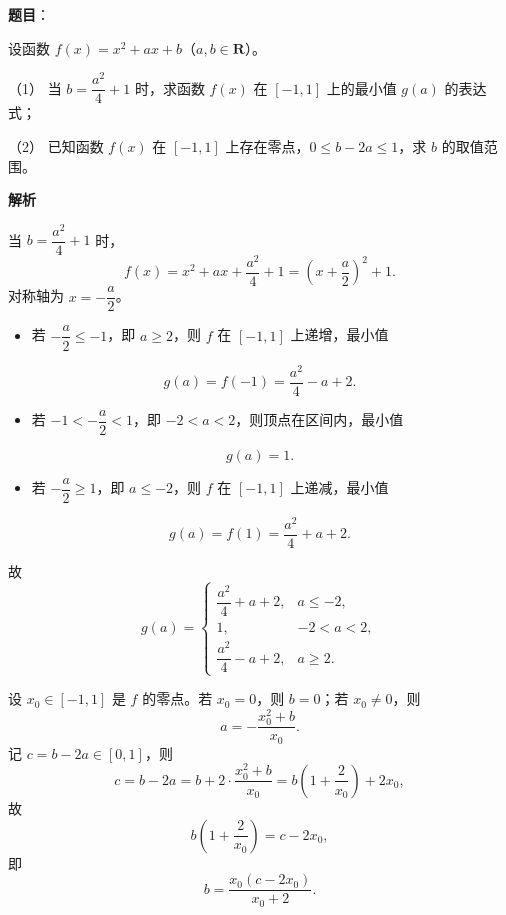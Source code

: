 \begin{answer}

\textbf{题目}：

设函数 \(f(x)=x^2+ax+b\)（\(a,b\in\mathbf{R}\)）。

（1） 当 \(b=\dfrac{a^2}{4}+1\) 时，求函数 \(f(x)\) 在 \([-1,1]\) 上的最小值 \(g(a)\) 的表达式；

（2） 已知函数 \(f(x)\) 在 \([-1,1]\) 上存在零点，\(0\leqslant b-2a\leqslant1\)，求 \(b\) 的取值范围。

\textbf{解析}


当 \(b=\dfrac{a^2}{4}+1\) 时，
\nopagebreak[4]
\[
f(x)=x^2+ax+\frac{a^2}{4}+1=\left(x+\frac{a}2\right)^2+1.
\]
对称轴为 \(x=-\dfrac{a}2\)。

\begin{itemize}
\item 若 \(-\dfrac{a}2\leqslant-1\)，即 \(a\geqslant2\)，则 \(f\) 在 \([-1,1]\) 上递增，最小值
\end{itemize}
\nopagebreak[4]
\[
  g(a)=f(-1)=\frac{a^2}{4}-a+2.
\]
\begin{itemize}
\item 若 \(-1<-\dfrac{a}2<1\)，即 \(-2<a<2\)，则顶点在区间内，最小值
\end{itemize}
\nopagebreak[4]
\[
  g(a)=1.
\]
\begin{itemize}
\item 若 \(-\dfrac{a}2\geqslant1\)，即 \(a\leqslant-2\)，则 \(f\) 在 \([-1,1]\) 上递减，最小值
\end{itemize}
\nopagebreak[4]
\[
  g(a)=f(1)=\frac{a^2}{4}+a+2.
\]

故
\nopagebreak[4]
\[
g(a)=\begin{cases}
\dfrac{a^2}{4}+a+2, & a\leqslant-2,\\
1, & -2<a<2,\\
\dfrac{a^2}{4}-a+2, & a\geqslant2.
\end{cases}
\]


设 \(x_0\in[-1,1]\) 是 \(f\) 的零点。若 \(x_0=0\)，则 \(b=0\)；若 \(x_0\neq0\)，则
\nopagebreak[4]
\[
a=-\frac{x_0^2+b}{x_0}.
\]
记 \(c=b-2a\in[0,1]\)，则
\nopagebreak[4]
\[
c=b-2a=b+2\cdot\frac{x_0^2+b}{x_0}
=b\left(1+\frac2{x_0}\right)+2x_0,
\]
故
\nopagebreak[4]
\[
b\left(1+\frac2{x_0}\right)=c-2x_0,
\]
即
\nopagebreak[4]
\[
b=\frac{x_0(c-2x_0)}{x_0+2}.
\]


\end{answer}
